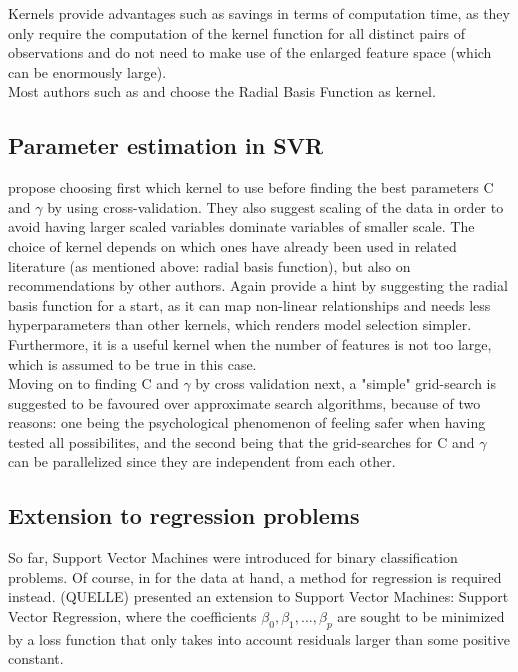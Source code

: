 \documentclass[a4paper, 11pt]{article}
\begin{document}
Kernels provide advantages such as savings in terms of computation time, as they only require the computation of the kernel function for all distinct pairs of observations and do not need to make use of the enlarged feature space (which can be enormously large).\\
Most authors such as \cite{Adhikari.2015} and \cite{MoscosoLopez.2016} choose the Radial Basis Function as kernel. 

\subsection{Parameter estimation in SVR}

\cite{Hsu.2003} propose choosing first which kernel to use before finding the best parameters C and $\gamma$ by using cross-validation. They also suggest scaling of the data in order to avoid having larger scaled variables dominate variables of smaller scale.
The choice of kernel depends on which ones have already been used in related literature (as mentioned above: radial basis function), but also on recommendations by other authors. Again \cite{Hsu.2003} provide a hint by suggesting the radial basis function for a start, as it can map non-linear relationships and needs less hyperparameters than other kernels, which renders model selection simpler. Furthermore, it is a useful kernel when the number of features is not too large, which is assumed to be true in this case.\\
Moving on to finding C and $\gamma$ by cross validation next, a "simple" grid-search is suggested to be favoured over approximate search algorithms, because of two reasons: one being the psychological phenomenon of feeling safer when having tested all possibilites, and the second being that the grid-searches for C and $\gamma$ can be parallelized since they are independent from each other. 

\subsection{Extension to regression problems}

So far, Support Vector Machines were introduced for binary classification problems. Of course, in for the data at hand, a method for regression is required instead. (QUELLE) presented an extension to Support Vector Machines: Support Vector Regression, where the coefficients $\beta_{0}, \beta_{1}, ..., \beta_{p}$ are sought to be minimized by a loss function that only takes into account residuals larger than some positive constant.
\end{document}
